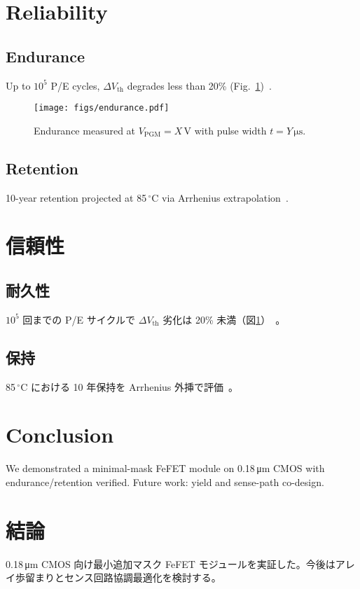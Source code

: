 \documentclass[journal]{IEEEtran}
\begin{document}
\section{Reliability}
\subsection*{Endurance}
Up to $10^5$ P/E cycles, $\Delta V_\mathrm{th}$ degrades less than 20\% (Fig.~\ref{fig:endurance})~\citep{mueller2015endurance,park2020nbdoping}.

\begin{figure}[!t]
  \centering
  \texttt{[image: figs/endurance.pdf]}
  \caption{Endurance measured at $V_\mathrm{PGM}=X$\,V with pulse width $t=Y\,\si{\micro\second}$.}
  \label{fig:endurance}
\end{figure}

\subsection*{Retention}
10-year retention projected at 85\,$^\circ$C via Arrhenius extrapolation~\citep{Yamazaki2018}.

\section*{信頼性}
\subsection*{耐久性}
$10^5$ 回までの P/E サイクルで $\Delta V_\mathrm{th}$ 劣化は 20\% 未満（図\ref{fig:endurance}）~\citep{mueller2015endurance,park2020nbdoping}。

\subsection*{保持}
85\,$^\circ$C における 10 年保持を Arrhenius 外挿で評価~\citep{Yamazaki2018}。

\section{Conclusion}
We demonstrated a minimal-mask FeFET module on 0.18\,\si{\micro\meter} CMOS with endurance/retention verified. Future work: yield and sense-path co-design.

\section*{結論}
0.18\,\si{\micro\meter} CMOS 向け最小追加マスク FeFET モジュールを実証した。今後はアレイ歩留まりとセンス回路協調最適化を検討する。



\end{document}
